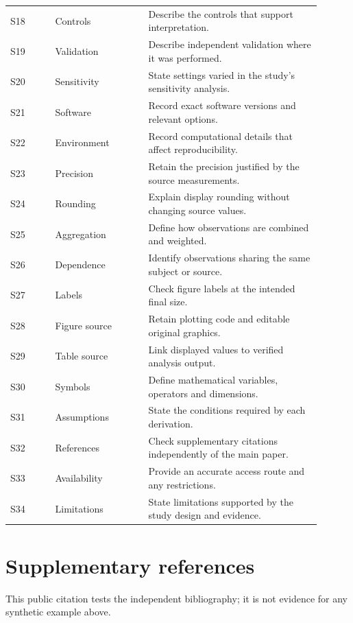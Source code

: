 \documentclass[11pt,a4paper]{article}
\begin{document}
\begin{longtable}{@{}p{0.13\linewidth}p{0.27\linewidth}p{0.50\linewidth}@{}}
S18 & Controls & Describe the controls that support interpretation.\\
S19 & Validation & Describe independent validation where it was performed.\\
S20 & Sensitivity & State settings varied in the study's sensitivity analysis.\\
S21 & Software & Record exact software versions and relevant options.\\
S22 & Environment & Record computational details that affect reproducibility.\\
S23 & Precision & Retain the precision justified by the source measurements.\\
S24 & Rounding & Explain display rounding without changing source values.\\
S25 & Aggregation & Define how observations are combined and weighted.\\
S26 & Dependence & Identify observations sharing the same subject or source.\\
S27 & Labels & Check figure labels at the intended final size.\\
S28 & Figure source & Retain plotting code and editable original graphics.\\
S29 & Table source & Link displayed values to verified analysis output.\\
S30 & Symbols & Define mathematical variables, operators and dimensions.\\
S31 & Assumptions & State the conditions required by each derivation.\\
S32 & References & Check supplementary citations independently of the main paper.\\
S33 & Availability & Provide an accurate access route and any restrictions.\\
S34 & Limitations & State limitations supported by the study design and evidence.\\
\end{longtable}
\normalsize

\section{Supplementary references}
This public citation tests the independent bibliography\cite{wilkinson2016fair};
it is not evidence for any synthetic example above.


\end{document}

